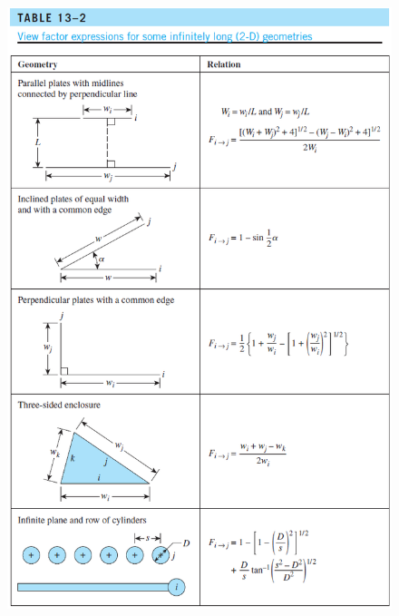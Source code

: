 \begin{itemize}
\begin{figure}[H]
        \includegraphics[width=1.0\linewidth]{images/View_factor_table_13_2.png}
    \end{figure}
    \begin{figure}[H]
        \centering

\end{figure}
\end{itemize}
